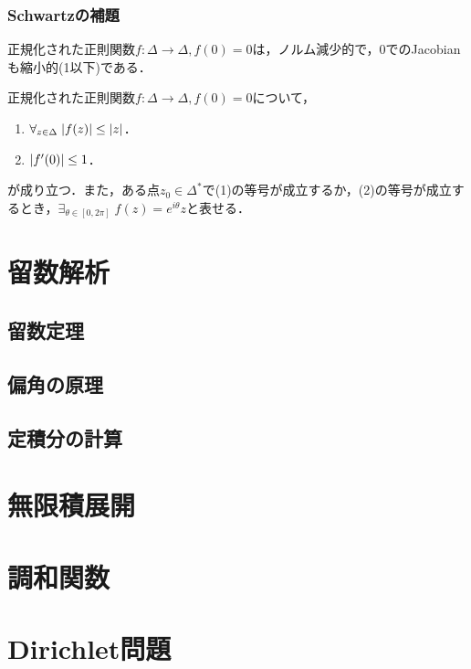 \documentclass[uplatex, dvipdfmx]{jsreport}
\begin{document}
\subsection{Schwartzの補題}

\begin{tcolorbox}[colframe=ForestGreen, colback=ForestGreen!10!white,breakable,colbacktitle=ForestGreen!40!white,coltitle=black,fonttitle=\bfseries\sffamily,
title=]
    正規化された正則関数$f:\Delta\to\Delta,f(0)=0$は，ノルム減少的で，$0$でのJacobianも縮小的(1以下)である．
\end{tcolorbox}

\begin{theorem}
    正規化された正則関数$f:\Delta\to\Delta,f(0)=0$について，
    \begin{enumerate}
        \item $\forall_{z\in\Delta}\;\lvert f(z)\rvert\le\lvert z\rvert$．
        \item $\lvert f'(0)\rvert\le 1$．
    \end{enumerate}
    が成り立つ．また，ある点$z_0\in\Delta^*$で(1)の等号が成立するか，(2)の等号が成立するとき，$\exists_{\theta\in[0,2\pi]}\;f(z)=e^{i\theta}z$と表せる．
\end{theorem}

\chapter{留数解析}

\section{留数定理}

\section{偏角の原理}

\section{定積分の計算}

\chapter{無限積展開}

\chapter{調和関数}

\chapter{Dirichlet問題}
\end{document}
